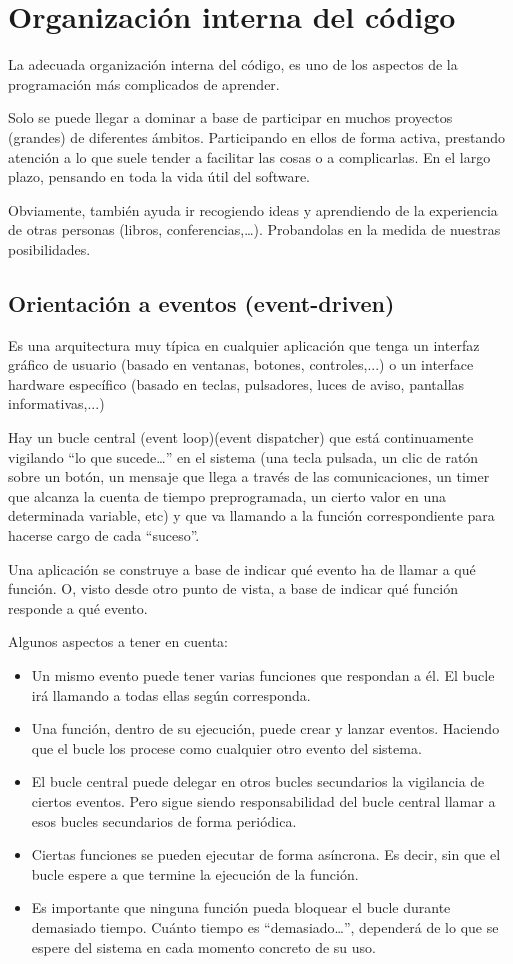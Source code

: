 \documentclass[spanish,12pt,a4paper,final,oneside]{book}
\begin{document}
\chapter{Organización interna del código}

La adecuada organización interna del código, es uno de los aspectos de la programación más complicados de aprender. 

Solo se puede llegar a dominar a base de participar en muchos proyectos (grandes) de diferentes ámbitos. Participando en ellos de forma activa, prestando atención a lo que suele tender a facilitar las cosas o a complicarlas. En el largo plazo, pensando en toda la vida útil del software.

Obviamente, también ayuda ir recogiendo ideas y aprendiendo de la experiencia de otras personas (libros, conferencias,\ldots). Probandolas en la medida de nuestras posibilidades.


\section{Orientación a eventos (event-driven)}\label{eventos}
Es una arquitectura muy típica en cualquier aplicación que tenga un interfaz gráfico de usuario (basado en ventanas, botones, controles,...) o un interface hardware específico (basado en teclas, pulsadores, luces de aviso, pantallas informativas,...)

Hay un bucle central (event loop)(event dispatcher) que está continuamente vigilando ``lo que sucede\ldots'' en el sistema (una tecla pulsada, un clic de ratón sobre un botón, un mensaje que llega a través de las comunicaciones, un timer que alcanza la cuenta de tiempo preprogramada, un cierto valor en una determinada variable, etc) y que va llamando a la función correspondiente para hacerse cargo de cada ``suceso''.

Una aplicación se construye a base de indicar qué evento ha de llamar a qué función. O, visto desde otro punto de vista, a base de indicar qué función responde a qué evento.

Algunos aspectos a tener en cuenta:
\begin{itemize}
\item Un mismo evento puede tener varias funciones que respondan a él. El bucle irá llamando a todas ellas según corresponda.
\item Una función, dentro de su ejecución, puede crear y lanzar eventos. Haciendo que el bucle los procese como cualquier otro evento del sistema.
\item El bucle central puede delegar en otros bucles secundarios la vigilancia de ciertos eventos. Pero sigue siendo responsabilidad del bucle central llamar a esos bucles secundarios de forma periódica.
\item Ciertas funciones se pueden ejecutar de forma asíncrona. Es decir, sin que el bucle espere a que termine la ejecución de la función.
\item Es importante que ninguna función pueda bloquear el bucle durante demasiado tiempo. Cuánto tiempo es ``demasiado\ldots'', dependerá de lo que se espere del sistema en cada momento concreto de su uso.
\end{itemize}
\end{document}
